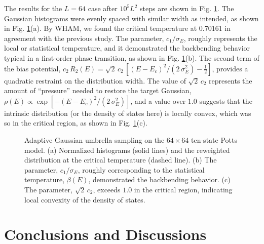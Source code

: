 \documentclass[reprint, superscriptaddress, floatfix]{revtex4-1}
\begin{document}
The results for the $L = 64$ case
after $10^5 L^2$ steps are shown
in Fig. \ref{fig:pt_hist}.
%
The Gaussian histograms were evenly spaced with similar width as intended,
as shown in Fig. \ref{fig:pt_hist}(a).
%
By WHAM, we found the critical temperature at $0.70161$
in agreement with the previous study\cite{wang2001pre}.
%
The parameter, $c_1/\sigma_E$, roughly represents
the local or statistical temperature,
and it demonstrated
the backbending behavior\cite{kim2006, *kim2007}
typical in a first-order phase transition,
as shown in Fig. \ref{fig:pt_hist}(b).
%
The second term of the bias potential,
$c_2 \, R_2(E) = \sqrt 2 \, c_2 \, [(E - E_c)^2/(2 \, \sigma_E^2) - \frac 1 2]$,
provides a quadratic restraint on the distribution width.
%
The value of $\sqrt 2 \, c_2$ represents the amount of ``pressure''
needed to restore the target Gaussian,
$\rho(E) \propto \exp[-(E - E_c)^2/(2 \, \sigma_E^2)]$,
and a value over $1.0$ suggests
that the intrinsic distribution
(or the density of states here)
is locally convex,
which was so in the critical region,
as shown in Fig. \ref{fig:pt_hist}(c).


\begin{figure}[h]
\begin{center}
  \caption{
    \label{fig:pt_hist}
    Adaptive Gaussian umbrella sampling
    on the $64 \times 64$ ten-state Potts model.
    (a) Normalized histograms (solid lines)
    and the reweighted distribution
    at the critical temperature (dashed line).
    (b) The parameter, $c_1/\sigma_E$, roughly corresponding to
    the statistical temperature, $\beta(E)$,
    demonstrated the backbending behavior.
    (c) The parameter, $\sqrt 2 \, c_2$, exceeds $1.0$
    in the critical region, indicating local convexity
    of the density of states.
  }
\end{center}
\end{figure}



\section{\label{sec:conclusion}
Conclusions and Discussions}
\end{document}
